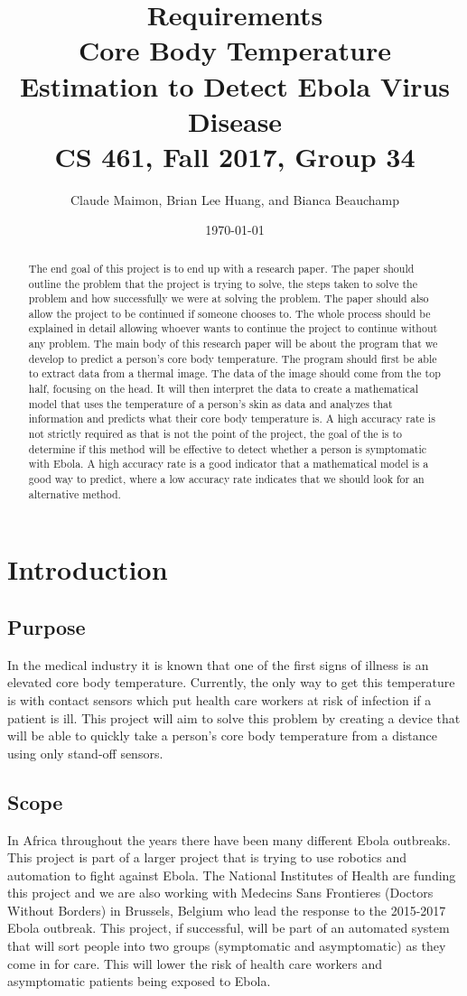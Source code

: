 \documentclass[10pt, draftclsnofoot, onecolumn]{IEEEtran}
\title{%
  Requirements \\
  \vspace{0.4cm}
  \large Core Body Temperature Estimation to Detect Ebola Virus Disease \\
  \vspace{0.4cm}
  \large CS 461, Fall 2017, Group 34\\
    }
\author{Claude Maimon, Brian Lee Huang, and Bianca Beauchamp}
\date{\today}
\begin{document}
\maketitle

\begin{abstract}
	The end goal of this project is to end up with a research paper. The paper should outline the problem that the project is trying to solve, the steps taken to solve the problem and how successfully we were
	at solving the problem. The paper should also allow the project to be continued if someone chooses to. The whole process should be explained in detail allowing whoever wants to continue the
	project to continue without any problem. The main body of this research paper will be about the program that we develop to predict a person's core body temperature. The program should first be able to
	extract data from a thermal image. The data of the image should come from the top half, focusing on the head. It will then interpret the data to create a mathematical model that uses the temperature of a 
	person's skin as data and analyzes that information and predicts what their core body temperature is. A high accuracy rate is not strictly required as that is not the point of the project, 
	the goal of the is to determine if this method will be effective to detect whether a person is symptomatic with Ebola. A high accuracy rate is a good indicator that a mathematical model
	is a good way to predict, where a low accuracy rate indicates that we should look for an alternative method.
\end{abstract}

\newpage
\section{Introduction}
	\subsection{Purpose}
	    In the medical industry it is known that one of the first signs of illness is an elevated core body temperature. Currently, the only way to get this temperature is with contact sensors which put health care workers at risk of infection if a patient is ill. This project will aim to solve this problem by creating a device that will be able to quickly take a person's core body temperature from a distance using only stand-off sensors.
	\subsection{Scope}
	    In Africa throughout the years there have been many different Ebola outbreaks. This project is part of a larger project that is trying to use robotics and automation to fight against Ebola. The National Institutes of Health are funding this project and we are also working with Medecins Sans Frontieres (Doctors Without Borders) in Brussels, Belgium who lead the response to the 2015-2017 Ebola outbreak. 
        This project, if successful, will be part of an automated system that will sort people into two groups (symptomatic and asymptomatic) as they come in for care. This will lower the risk of health care workers and asymptomatic patients being exposed to Ebola. 
\end{document}
